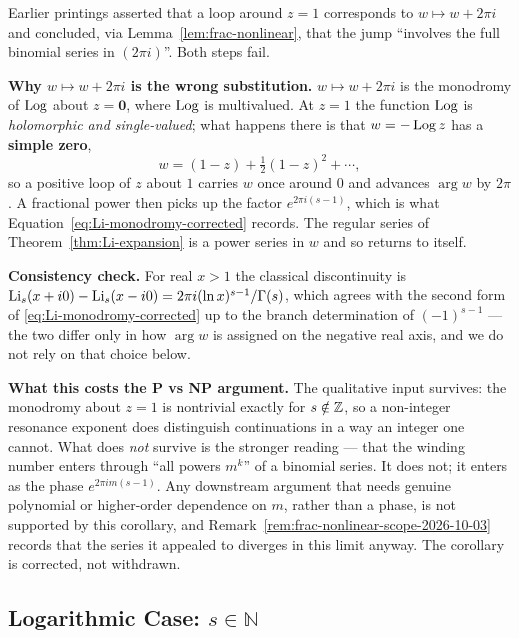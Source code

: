 \begin{remark}
\label{rem:monodromy-correction-2026-10-03}
Earlier printings asserted that a loop around $z = 1$ corresponds to
$w \mapsto w + 2\pi i$ and concluded, via
Lemma~\ref{lem:frac-nonlinear}, that the jump ``involves the full binomial
series in $(2\pi i)$''. Both steps fail.

\textbf{Why $w \mapsto w + 2\pi i$ is the wrong substitution.}
$w \mapsto w + 2\pi i$ is the monodromy of $\operatorname{Log}$ about $z = \mathbf{0}$, where
$\operatorname{Log}$ is multivalued. At $z = 1$ the function $\operatorname{Log}$ is \emph{holomorphic and
single-valued}; what happens there is that $w = -\operatorname{Log} z$ has a \textbf{simple
zero},
\begin{equation}
w = (1-z) + \tfrac{1}{2}(1-z)^2 + \cdots,
\end{equation}
so a positive loop of $z$ about $1$ carries $w$ once around $0$ and advances
$\arg w$ by $2\pi$. A fractional power then picks up the factor
$e^{2\pi i (s-1)}$, which is what Equation~\eqref{eq:Li-monodromy-corrected}
records. The regular series of Theorem~\ref{thm:Li-expansion} is a power series
in $w$ and so returns to itself.

\textbf{Consistency check.} For real $x > 1$ the classical discontinuity is
$\operatorname{Li}_s(x + i0) - \operatorname{Li}_s(x - i0) = 2\pi i (\ln x)^{s-1}/\Gamma(s)$, which agrees
with the second form of \eqref{eq:Li-monodromy-corrected} up to the branch
determination of $(-1)^{s-1}$ --- the two differ only in how $\arg w$ is assigned
on the negative real axis, and we do not rely on that choice below.

\textbf{What this costs the P vs NP argument.} The qualitative input survives:
the monodromy about $z = 1$ is nontrivial exactly for $s \notin \mathbb{Z}$, so a
non-integer resonance exponent does distinguish continuations in a way an integer
one cannot. What does \emph{not} survive is the stronger reading --- that the
winding number enters through ``all powers $m^k$'' of a binomial series. It does
not; it enters as the phase $e^{2\pi i m(s-1)}$. Any downstream argument that
needs genuine polynomial or higher-order dependence on $m$, rather than a phase,
is not supported by this corollary, and
Remark~\ref{rem:frac-nonlinear-scope-2026-10-03} records that the series it
appealed to diverges in this limit anyway. The corollary is corrected, not
withdrawn.
\end{remark}

\subsection{Logarithmic Case: \texorpdfstring{$s \in \mathbb{N}$}{s in N}}

